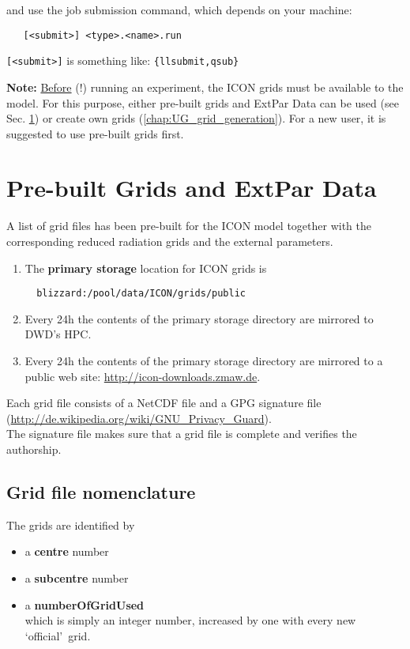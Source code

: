 and use the job submission command, which depends on your machine:

\begin{small}
  \begin{verbatim}
   [<submit>] <type>.<name>.run
  \end{verbatim}
\end{small} 

\verb+[<submit>]+ is something like: \verb+{llsubmit,qsub}+

\textbf{Note:} \underline{Before} (!) running an experiment, the ICON grids must be available to the model. For this purpose, either pre-built grids and ExtPar Data can be used (see Sec. \ref{chap:prebuilt_grid}) or create own grids (\ref{chap:UG_grid_generation}). For a new user, it is suggested to use pre-built grids first.

\section{Pre-built Grids and ExtPar Data}\label{chap:prebuilt_grid}
A list of grid files has been pre-built for the ICON model together with the corresponding reduced radiation grids and the external parameters.

\begin{enumerate}
\item The \textbf{primary storage} location for ICON grids is
\begin{small}
 \begin{verbatim}
  blizzard:/pool/data/ICON/grids/public 
 \end{verbatim}
\end{small}
\item Every 24h the contents of the primary storage directory are mirrored to DWD's HPC.
\item Every 24h the contents of the primary storage directory are mirrored to a public web site:
\href{http://icon-downloads.zmaw.de}{http://icon-downloads.zmaw.de}.
\end{enumerate}

Each grid file consists of a NetCDF file and a GPG signature file\\ 
(\href{http://de.wikipedia.org/wiki/GNU\_Privacy\_Guard}{http://de.wikipedia.org/wiki/GNU\_Privacy\_Guard}).\\ 
The signature file makes sure that a grid file is complete and verifies the authorship.

\subsection{Grid file nomenclature}
The grids are identified by
\begin{itemize}
\item a \textbf{centre} number
\item a \textbf{subcentre} number
\item a \textbf{numberOfGridUsed}\\
which is simply an integer number, increased by one with every new \lq official\rq\ grid.  
\end{itemize}

